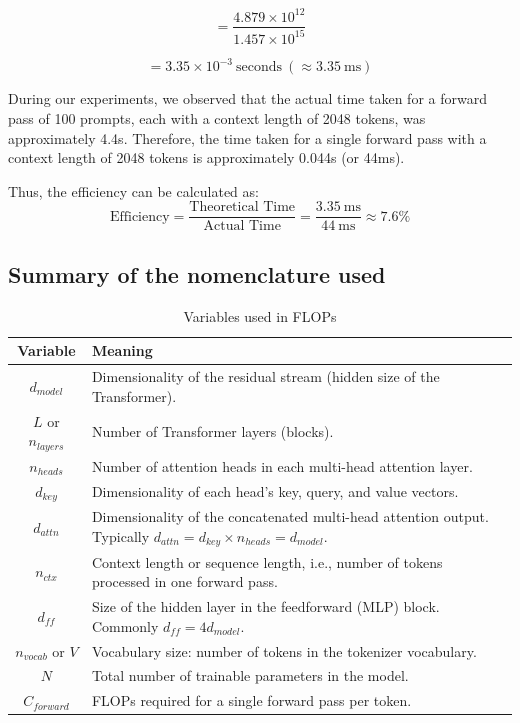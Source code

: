 \[
= \frac{4.879 \times 10^{12}}{1.457 \times 10^{15}}
\]

\[
= 3.35 \times 10^{-3}\ \text{seconds} \ (\approx 3.35\ \text{ms})
\]


During our experiments, we observed that the actual time taken for a forward pass of 100 prompts, each with a context length of 2048 tokens, was approximately 4.4s. Therefore, the time taken for a single forward pass with a context length of 2048 tokens is approximately 0.044s (or 44ms).

Thus, the efficiency can be calculated as:
\[\text{Efficiency} = \frac{\text{Theoretical Time}}{\text{Actual Time}} = \frac{3.35\ \text{ms}}{44\ \text{ms}} \approx 7.6\%\]



\subsection{Summary of the nomenclature used}
\begin{table}[h]
\centering
\begin{tabular}{|c|p{13cm}|}
\hline
\textbf{Variable} & \textbf{Meaning} \\
\hline
$d_{model}$ & Dimensionality of the residual stream (hidden size of the Transformer). \\
\hline
$L$ or $n_{layers}$ & Number of Transformer layers (blocks). \\
\hline
$n_{heads}$ & Number of attention heads in each multi-head attention layer. \\
\hline
$d_{key}$ & Dimensionality of each head’s key, query, and value vectors. \\
\hline
$d_{attn}$ & Dimensionality of the concatenated multi-head attention output. Typically $d_{attn} = d_{key} \times n_{heads} = d_{model}$. \\
\hline
$n_{ctx}$ & Context length or sequence length, i.e., number of tokens processed in one forward pass. \\
\hline
$d_{ff}$ & Size of the hidden layer in the feedforward (MLP) block. Commonly $d_{ff} = 4d_{model}$. \\
\hline
$n_{vocab}$ or $V$ & Vocabulary size: number of tokens in the tokenizer vocabulary. \\
\hline
$N$ & Total number of trainable parameters in the model. \\
\hline
$C_{forward}$ & FLOPs required for a single forward pass per token. \\
\hline
\end{tabular}
\caption{Variables used in FLOPs}
\end{table}
